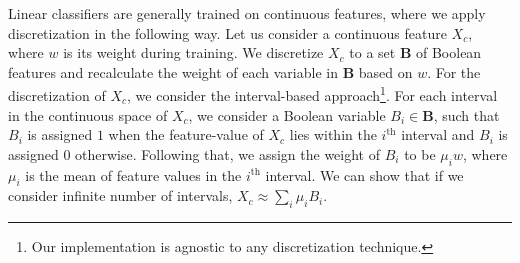 Linear classifiers are generally trained on continuous features, where we apply discretization in the following way. Let us consider a continuous feature $X_c$, where $w$ is its weight during training. We discretize $ X_c $ to a set $ \mathbf{B} $ of Boolean features and recalculate the weight of each variable in $ \mathbf{B} $ based on $ w $. For the discretization of $X_c$, we consider the interval-based approach\footnote{Our implementation is agnostic to any discretization technique.}. For each interval in the continuous space of $X_c$, we consider a Boolean variable $B_i \in \mathbf{B}$, such that $ B_i $ is assigned $ 1 $ when the feature-value of $X_c$ lies within the $i^{\mathrm{th}}$ interval and $ B_i $ is assigned $ 0 $ otherwise. Following that, we assign the weight of $ B_i $ to be $ \mu_iw $, where $ \mu_i $ is the mean of feature values in the $i^{\mathrm{th}}$ interval. We can show that if we consider infinite number of intervals, $ X_c \approx \sum_i \mu_i B_i $. 


\noindent\makebox[\linewidth]{\rule{\paperwidth}{2pt}}

